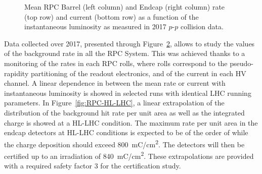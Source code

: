 \begin{figure}[H]
\begin{subfigure}{0.5\linewidth}
			\caption{\label{fig:Rate-I-vs-Lumi:D}}
		\end{subfigure}
		\caption{\label{fig:Rate-I-vs-Lumi} Mean RPC Barrel (left column) and Endcap (right column) rate (top row) and current (bottom row) as a function of the instantaneous luminosity as measured in 2017 $p$-$p$ collision data.}
	\end{figure}

	Data collected over 2017, presented through Figure~\ref{fig:Rate-I-vs-Lumi}, allows to study the values of the background rate in all the RPC System. This was achieved thanks to a monitoring of the rates in each RPC rolls, where rolls correspond to the pseudo-rapidity partitioning of the readout electronics, and of the current in each HV channel. A linear dependence in between the mean rate or current with instantaneous luminosity is showed in selected runs with identical LHC running parameters. In Figure~\ref{fig:RPC-HL-LHC}, a linear extrapolation of the distribution of the background hit rate per unit area as well as the integrated charge is showed at a HL-LHC condition. The maximum rate per unit area in the endcap detectors at HL-LHC conditions is expected to be of the order of  while the charge deposition should exceed \SI{800}{mC/cm^2}. The detectors will then be certified up to an irradiation of \SI{840}{mC/cm^2}. These extrapolations are provided with a required safety factor 3 for the certification study.
    
